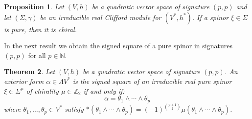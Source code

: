 \documentclass[10pt,reqno]{amsart}
\newtheorem{theorem}{Theorem}[section]
\newtheorem{proposition}[theorem]{Proposition}
\theoremstyle{definition}
\theoremstyle{remark}
\newcommand{\N}{\mathbb{N}}
\newcommand{\Z}{\mathbb{Z}}
\begin{document}
\begin{proposition}
    Let $(V,h)$ be a quadratic vector space of signature $(p,p)$ and let $(\Sigma,\gamma)$ be an irreducible real Clifford module for $(V^*,h^*)$. If a spinor $\xi\in\Sigma$ is pure, then it is chiral.
\end{proposition}

In the next result we obtain the signed square of a pure spinor in signatures $(p,p)$ for all $p\in\N$.

\begin{theorem}\label{thm:square_(p,p)}
    Let $(V,h)$ be a quadratic vector space of signature $(p,p)$. An exterior form $\alpha\in\Lambda V^*$ is the signed square of an irreducible real pure spinor $\xi\in\Sigma^\mu$ of chirality $\mu\in\Z_2$ if and only if: $$\alpha=\theta_1\wedge\cdots\wedge\theta_p$$ where $\theta_1,\ldots,\theta_p\in V^*$ satisfy $*(\theta_1\wedge\cdots\wedge\theta_p)=(-1)^{\binom{p+1}{2}}\mu(\theta_1\wedge\cdots\wedge\theta_p)$.
\end{theorem}
\end{document}
